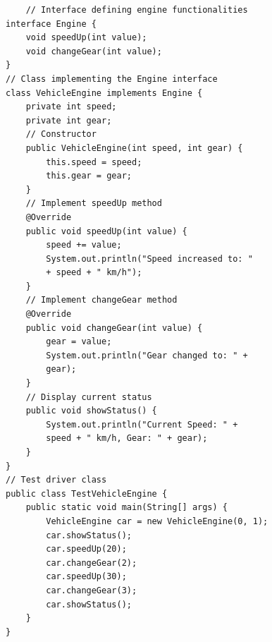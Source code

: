 \begin{verbatim}
    // Interface defining engine functionalities
interface Engine {
    void speedUp(int value);
    void changeGear(int value);
}
// Class implementing the Engine interface
class VehicleEngine implements Engine {
    private int speed;
    private int gear;
    // Constructor
    public VehicleEngine(int speed, int gear) {
        this.speed = speed;
        this.gear = gear;
    }
    // Implement speedUp method
    @Override
    public void speedUp(int value) {
        speed += value;
        System.out.println("Speed increased to: " 
        + speed + " km/h");
    }
    // Implement changeGear method
    @Override
    public void changeGear(int value) {
        gear = value;
        System.out.println("Gear changed to: " + 
        gear);
    }
    // Display current status
    public void showStatus() {
        System.out.println("Current Speed: " + 
        speed + " km/h, Gear: " + gear);
    }
}
// Test driver class
public class TestVehicleEngine {
    public static void main(String[] args) {
        VehicleEngine car = new VehicleEngine(0, 1);
        car.showStatus();
        car.speedUp(20);
        car.changeGear(2);
        car.speedUp(30);
        car.changeGear(3);
        car.showStatus();
    }
}

\end{verbatim}